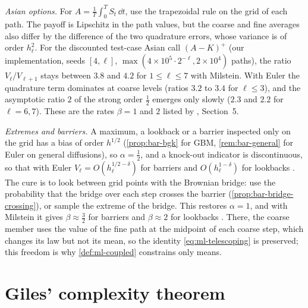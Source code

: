 \emph{Asian options.} For $A=\frac1T\int_0^TS_t\,\dd t$, use the trapezoidal rule on the grid of
each path. The payoff is Lipschitz in the path values, but the coarse and fine averages also
differ by the difference of the two quadrature errors, whose variance is of order $h_\ell^2$.
For the discounted test-case Asian call $(A-K)^+$ (our implementation, seeds $[4,\ell]$,
$\max(4\times10^5\cdot2^{-\ell},2\times10^4)$ paths), the ratio $V_\ell/V_{\ell+1}$ stays between
$3.8$ and $4.2$ for $1\le\ell\le7$ with Milstein. With Euler the quadrature term dominates at
coarse levels (ratios $3.2$ to $3.4$ for $\ell\le3$), and the asymptotic ratio $2$ of the strong
order $\frac12$ emerges only slowly ($2.3$ and $2.2$ for $\ell=6,7$).
These are the rates $\beta=1$ and $2$ listed by \textcite{giles-acta}, Section~5.

\emph{Extremes and barriers.} A maximum, a lookback or a barrier inspected only on the grid has a
bias of order $h^{1/2}$ (\cref{prop:bar-bgk} for GBM, \cref{rem:bar-general} for Euler on general diffusions), so $\alpha=\frac12$, and a knock-out indicator is
discontinuous, so that with Euler $V_\ell=O(h_\ell^{1/2-\delta})$ for barriers and
$O(h_\ell^{1-\delta})$ for lookbacks \citep{giles-higham-mao}. The cure is to look between grid
points with the Brownian bridge: use the probability that the bridge over each step crosses the
barrier (\cref{prop:bar-bridge-crossing}), or sample the extreme of the bridge. This restores
$\alpha=1$, and with Milstein it gives $\beta\approx\frac32$ for barriers and $\beta\approx2$ for
lookbacks \citep{giles-milstein}. There, the coarse member uses the value of the fine path at the
midpoint of each coarse step, which changes its law but not its mean, so the identity
\eqref{eq:ml-telescoping} is preserved; this freedom is why \cref{def:ml-coupled} constrains only
means.

\section{Giles' complexity theorem}\label{sec:ml-complexity}

